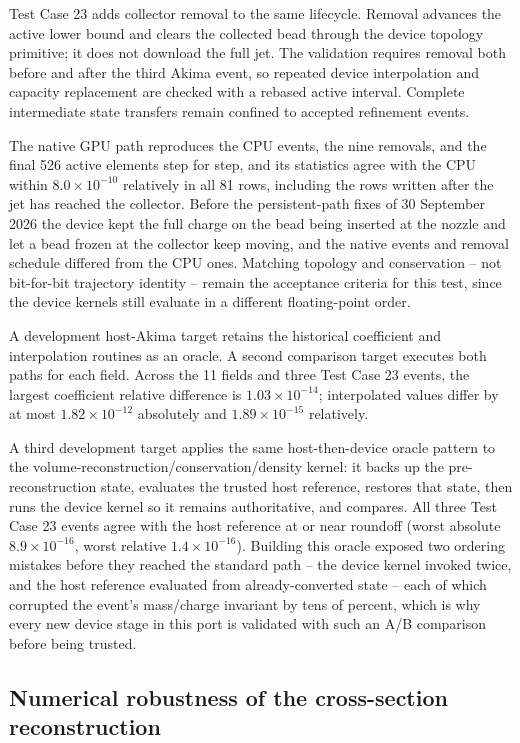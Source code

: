 Test Case 23 adds collector removal to the same lifecycle. Removal advances
the active lower bound and clears the collected bead through the device
topology primitive; it does not download the full jet. The validation requires
removal both before and after the third Akima event, so repeated device
interpolation and capacity replacement are checked with a rebased active
interval. Complete intermediate state transfers remain confined to accepted
refinement events.

The native GPU path reproduces the CPU events, the nine removals, and the
final 526 active elements step for step, and its statistics agree with the
CPU within $8.0\times10^{-10}$ relatively in all 81 rows, including the rows
written after the jet has reached the collector.  Before the persistent-path
fixes of 30 September 2026 the device kept the full charge on the bead being
inserted at the nozzle and let a bead frozen at the collector keep moving,
and the native events and removal schedule differed from the CPU ones.
Matching topology and conservation -- not bit-for-bit trajectory identity --
remain the acceptance criteria for this test, since the device kernels still
evaluate in a different floating-point order.

A development host-Akima target retains the historical coefficient and
interpolation routines as an oracle. A second comparison target executes both
paths for each field. Across the 11 fields and three Test Case 23 events, the
largest coefficient relative difference is $1.03\times10^{-14}$; interpolated
values differ by at most $1.82\times10^{-12}$ absolutely and
$1.89\times10^{-15}$ relatively.

A third development target applies the same host-then-device oracle pattern
to the volume-reconstruction/conservation/density kernel: it backs up the
pre-reconstruction state, evaluates the trusted host reference, restores that
state, then runs the device kernel so it remains authoritative, and compares.
All three Test Case 23 events agree with the host reference at or near
roundoff (worst absolute $8.9\times10^{-16}$, worst relative
$1.4\times10^{-16}$). Building this oracle exposed two ordering mistakes
before they reached the standard path -- the device kernel invoked twice, and
the host reference evaluated from already-converted state -- each of which
corrupted the event's mass/charge invariant by tens of percent, which is why
every new device stage in this port is validated with such an A/B comparison
before being trusted.

\subsection{Numerical robustness of the cross-section reconstruction\label{subsec:Refinement-robustness}}

